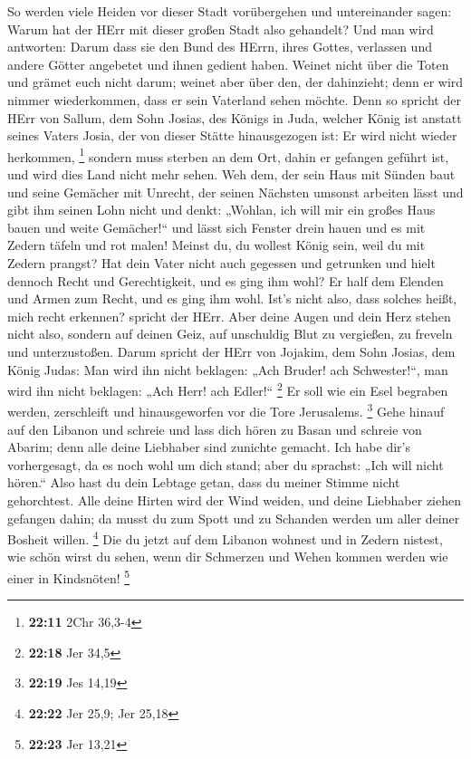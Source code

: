  So werden viele Heiden vor dieser Stadt vorübergehen und
untereinander sagen: Warum hat der HErr mit dieser großen Stadt also
gehandelt?  Und man wird antworten: Darum dass sie den Bund
des HErrn, ihres Gottes, verlassen und andere Götter angebetet und ihnen
gedient haben.  Weinet nicht über die Toten und grämet euch
nicht darum; weinet aber über den, der dahinzieht; denn er wird nimmer
wiederkommen, dass er sein Vaterland sehen möchte.  Denn so
spricht der HErr von Sallum, dem Sohn Josias, des Königs in Juda,
welcher König ist anstatt seines Vaters Josia, der von dieser Stätte
hinausgezogen ist: Er wird nicht wieder herkommen, \footnote{\textbf{22:11}
  2Chr 36,3-4}  sondern muss sterben an dem Ort, dahin er
gefangen geführt ist, und wird dies Land nicht mehr sehen. 
Weh dem, der sein Haus mit Sünden baut und seine Gemächer mit Unrecht,
der seinen Nächsten umsonst arbeiten lässt und gibt ihm seinen Lohn
nicht  und denkt: „Wohlan, ich will mir ein großes Haus
bauen und weite Gemächer!{}`` und lässt sich Fenster drein hauen und es
mit Zedern täfeln und rot malen!  Meinst du, du wollest
König sein, weil du mit Zedern prangst? Hat dein Vater nicht auch
gegessen und getrunken und hielt dennoch Recht und Gerechtigkeit, und es
ging ihm wohl?  Er half dem Elenden und Armen zum Recht,
und es ging ihm wohl. Ist's nicht also, dass solches heißt, mich recht
erkennen? spricht der HErr.  Aber deine Augen und dein Herz
stehen nicht also, sondern auf deinen Geiz, auf unschuldig Blut zu
vergießen, zu freveln und unterzustoßen.  Darum spricht der
HErr von Jojakim, dem Sohn Josias, dem König Judas: Man wird ihn nicht
beklagen: „Ach Bruder! ach Schwester!{}``, man wird ihn nicht beklagen:
„Ach Herr! ach Edler!{}`` \footnote{\textbf{22:18} Jer 34,5}
 Er soll wie ein Esel begraben werden, zerschleift und
hinausgeworfen vor die Tore Jerusalems. \footnote{\textbf{22:19} Jes
  14,19}  Gehe hinauf auf den Libanon und schreie und lass
dich hören zu Basan und schreie von Abarim; denn alle deine Liebhaber
sind zunichte gemacht.  Ich habe dir's vorhergesagt, da es
noch wohl um dich stand; aber du sprachst: „Ich will nicht hören.`` Also
hast du dein Lebtage getan, dass du meiner Stimme nicht gehorchtest.
 Alle deine Hirten wird der Wind weiden, und deine
Liebhaber ziehen gefangen dahin; da musst du zum Spott und zu Schanden
werden um aller deiner Bosheit willen. \footnote{\textbf{22:22} Jer
  25,9; Jer 25,18}  Die du jetzt auf dem Libanon wohnest
und in Zedern nistest, wie schön wirst du sehen, wenn dir Schmerzen und
Wehen kommen werden wie einer in Kindsnöten! \footnote{\textbf{22:23}
  Jer 13,21}

